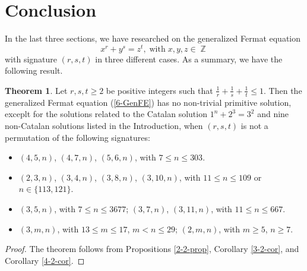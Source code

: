 \documentclass[a4paper, 12pt]{article}
\DeclareMathOperator{\Z}{\mathbb{Z}}
\numberwithin{equation}{section}
\theoremstyle{definition}
\newtheorem{thm}{Theorem}[section]
\begin{document}
\section{Conclusion}
In the last three sections, we have researched on the generalized Fermat equation \begin{equation} \label{6-GenFE} \tag{$\star$}
x^r + y^s = z^t, \;\text{with}\; x, y, z\in\Z
\end{equation}
with signature $(r,s,t)$ in three different cases. 
As a summary, we have the following result.

\begin{thm} \label{5-thm1}
Let $r,s,t\ge 2$ be positive integers such that $\frac{1}{r} + \frac{1}{s} + \frac{1}{t} \le 1$. 
Then the generalized Fermat equation (\ref{6-GenFE}) has no non-trivial primitive solution, exceplt for the solutions related to the Catalan solution $1^n+2^3 = 3^2$ and nine non-Catalan solutions listed in the Introduction, when $(r,s,t)$ is not a permutation of the following signatures:
\begin{itemize}
\item $(4,5,n)$, $(4,7,n)$, $(5,6,n)$, with $7 \le n \le 303$.
\item $(2,3,n)$, $(3,4,n)$, $(3,8,n)$, $(3,10,n)$, with $11\le n \le 109$ or $n\in \{113, 121\}$.
\item $(3,5,n)$, with $7\le n \le 3677$; $(3,7,n)$, $(3,11,n)$, with $11 \le n \le 667$.
\item $(3,m,n)$, with $13 \le m \le 17$, $m < n \le 29$; $(2,m,n)$, with $m \ge 5$, $n\ge 7$.
\end{itemize} 
\end{thm}
\begin{proof}
The theorem follows from Propositions \ref{2-2-prop}, Corollary \ref{3-2-cor}, and Corollary \ref{4-2-cor}.
\end{proof}
\end{document}
